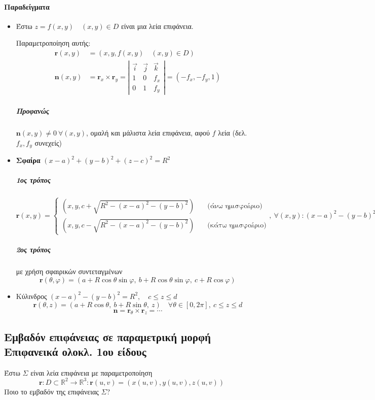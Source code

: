 \documentclass[11pt,a4paper,titlepage]{article}
\begin{document}

\paragraph{Παραδείγματα}
\begin{itemize}
\item Έστω \( z = f(x,y)  \quad (x,y) \in D \) είναι μια λεία επιφάνεια.

Παραμετροποίηση αυτής:
\begin{align*}
\mathbf r(x,y) &= \left(x,y,f(x,y) \quad (x,y)\in D \right) \\
\mathbf n(x,y) &= \mathbf r_x \times \mathbf r_y = \left|
\begin{matrix}
\vec i & \vec j & \vec k \\
1 & 0 & f_x \\
0 & 1 & f_y
\end{matrix}
\right| = \left(-f_x,-f_y,1\right)
\end{align*}
\subparagraph{Προφανώς} \( \mathbf n(x,y) \neq 0 \ \forall (x,y) \), ομαλή και μάλιστα λεία επιφάνεια, αφού \( f \) λεία (δελ. \( f_x,f_y \) συνεχείς)
\item \textbf{Σφαίρα} \( (x-a)^2+(y-b)^2+(z-c)^2=R^2 \)
\subparagraph{1ος τρόπος}
\[
\mathbf{r}(x,y) = \begin{cases}
\left(x,y,c+\sqrt{R^2-(x-a)^2-(y-b)^2}\right) \quad& \text{(άνω ημισφαίριο)} \\
\left(x,y,c-\sqrt{R^2-(x-a)^2-(y-b)^2}\right) \quad& \text{(κάτω ημισφαίριο)}
\end{cases},\ \forall (x,y): (x-a)^2-(y-b)^2\leq R
\]
\subparagraph{2ος τρόπος}
με χρήση σφαιρικών συντεταγμένων
\[
\mathbf r(\theta,\varphi) = \left(
a+R\cos\theta\sin\varphi,\ b+R\cos\theta\sin\varphi,\ c+R\cos\varphi
\right)
\]
\item Κύλινδρος \( (x-a)^2-(y-b)^2=R^2 , \quad c\leq z \leq d \)
\[
\mathbf r(\theta,z) = \left(
a+R\cos\theta,\ b+R\sin\theta,\ z
\right) \quad \forall \theta \in [0,2\pi],\ c\leq z \leq d
\]
\[
\mathbf n = \mathbf r_\theta \times \mathbf r_z = \cdots
\]
\end{itemize}

\subsection{Εμβαδόν επιφάνειας σε παραμετρική μορφή\\Επιφανεικά ολοκλ. 1ου είδους}
Έστω \( \varSigma \) είναι λεία επιφάνεια με παραμετροποίηση
\[
\mathbf r: D \subset \mathbb R ^2 \to \mathbb R ^3: \mathbf r(u,v) = \left(
x(u,v),y(u,v),z(u,v)
\right)
\]
Ποιο το εμβαδόν της επιφάνειας \( \varSigma \)?
\end{document}
